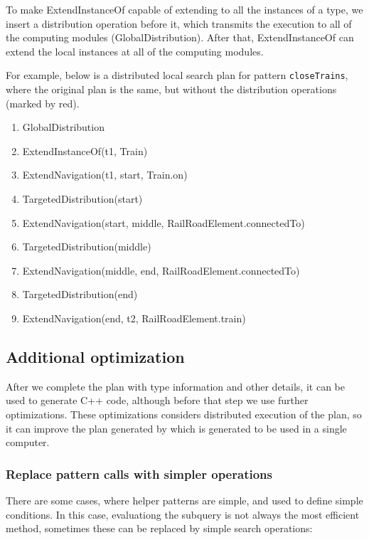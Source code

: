 To make ExtendInstanceOf capable of extending to all the instances of a type, we insert a distribution operation before it, which transmits the execution to all of the computing modules (GlobalDistribution). After that, ExtendInstanceOf can extend the local instances at all of the computing modules.

For example, below is a distributed local search plan for pattern \texttt{closeTrains}, where the original plan is the same, but without the distribution operations (marked by red).

\begin{enumerate}
	\begingroup\color{red} 
	\item GlobalDistribution
	\endgroup
	\item ExtendInstanceOf(t1, Train)
	\item ExtendNavigation(t1, start, Train.on)
	\begingroup\color{red} 
	\item TargetedDistribution(start)
	\endgroup
	\item ExtendNavigation(start, middle, RailRoadElement.connectedTo)
	\begingroup\color{red} 
	\item TargetedDistribution(middle)
	\endgroup
	\item ExtendNavigation(middle, end, RailRoadElement.connectedTo)
	\begingroup\color{red} 
	\item TargetedDistribution(end)
	\endgroup
	\item ExtendNavigation(end, t2, RailRoadElement.train)	
\end{enumerate}


\subsection{Additional optimization}

After we complete the plan with type information and other details, it can be used to generate C++ code, although before that step we use further optimizations. 
These optimizations considers distributed execution of the plan, so it can improve the plan generated by \viatra{} which is generated to be used in a single computer.


\subsubsection{Replace pattern calls with simpler operations}
There are some cases, where helper patterns are simple, and used to define simple conditions. 
In this case, evaluationg the subquery is not always the most efficient method, sometimes these can be replaced by simple search operations:

